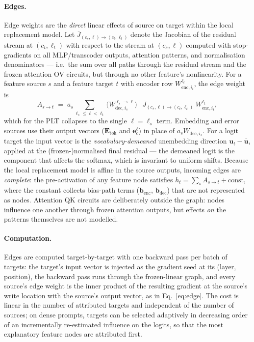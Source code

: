 \documentclass[11pt,a4paper]{article}
\newcommand{\enci}[2]{W_{\mathrm{enc},#2}^{#1}}   %
\newcommand{\deci}[2]{W_{\mathrm{dec},#2}^{#1}}   %
\newcommand{\bdec}{\bm{b}_{\mathrm{dec}}}
\newcommand{\benc}{\bm{b}_{\mathrm{enc}}}
\newcommand{\stopgrad}{\bar{J}}          %
\begin{document}
\paragraph{Edges.}
Edge weights are the \emph{direct} linear effects of source on target within the local
replacement model. Let $\stopgrad_{(c_s,\ell)\to(c_t,\ell_t)}$ denote the Jacobian of
the residual stream at $(c_t,\ell_t)$ with respect to the stream at $(c_s,\ell)$
computed with stop-gradients on all MLP/transcoder outputs, attention patterns, and
normalisation denominators --- i.e.\ the sum over all paths through the residual
stream and the frozen attention OV circuits, but through no other feature's
nonlinearity. For a feature source $s$ and a feature target $t$ with encoder row
$\enci{\ell_t}{i_t}$, the edge weight is
\begin{equation}
A_{s\to t} \;=\; a_s \sum_{\ell_s \le \ell < \ell_t}
\big(\deci{\ell_s\to\ell}{i_s}\big)^{\top}\,
\stopgrad_{(c_s,\ell)\to(c_t,\ell_t)}\;
\enci{\ell_t}{i_t},
\label{eq:edge}
\end{equation}
which for the PLT collapses to the single $\ell=\ell_s$ term. Embedding and error
sources use their output vectors ($\bm{E}_{\mathrm{tok}}$ and $\bm{e}^{\ell}_c$) in
place of $a_s\deci{}{i_s}$. For a logit target the input vector is the
\emph{vocabulary-demeaned} unembedding direction $\bm{u}_t-\bar{\bm{u}}$, applied at
the (frozen-)normalised final residual --- the demeaned logit is the component that
affects the softmax, which is invariant to uniform shifts. Because the local
replacement model is affine in the source outputs, incoming edges are \emph{complete}:
the pre-activation of any feature node satisfies $h_t=\sum_{s}A_{s\to t}+\text{const}$,
where the constant collects bias-path terms ($\benc$, $\bdec$) that are not
represented as nodes. Attention QK circuits are deliberately outside the graph: nodes
influence one another through frozen attention outputs, but effects \emph{on} the
patterns themselves are not modelled.

\paragraph{Computation.}
Edges are computed target-by-target with one backward pass per batch of targets: the
target's input vector is injected as the gradient seed at its (layer, position), the
backward pass runs through the frozen-linear graph, and every source's edge weight is
the inner product of the resulting gradient at the source's write location with the
source's output vector, as in Eq.~\eqref{eq:edge}. The cost is linear in the number of
attributed targets and independent of the number of sources; on dense prompts, targets
can be selected adaptively in decreasing order of an incrementally re-estimated
influence on the logits, so that the most explanatory feature nodes are attributed
first.
\end{document}
